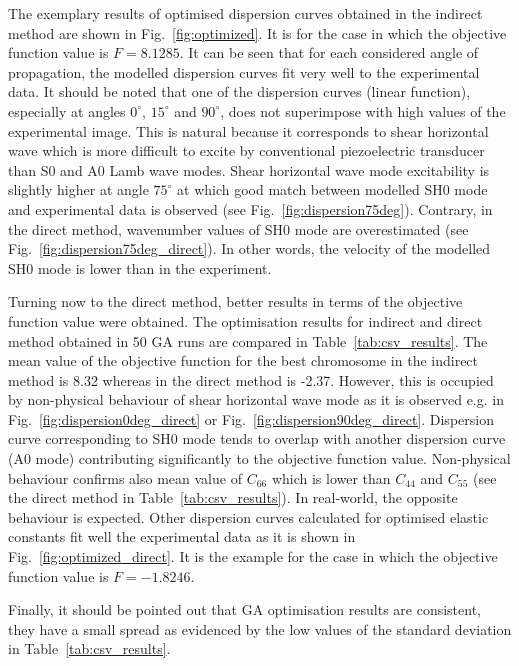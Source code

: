 \documentclass[preprint,12pt]{elsarticle}
\begin{document}
The exemplary results of optimised dispersion curves obtained in the indirect method 
are shown in Fig.~\ref{fig:optimized}. It is for the case in which the objective function 
value is \(F=8.1285\). It can be seen that for each considered angle of propagation, the 
modelled dispersion curves fit very well to the experimental data. It should be noted that 
one of the dispersion curves (linear function), especially at angles \(0^{\circ}\), 
\(15^{\circ}\) and \(90^{\circ}\), does not superimpose with high values of the 
experimental 
image. This is natural because it corresponds to shear horizontal wave which is more 
difficult to excite by conventional piezoelectric transducer than S0 and A0 Lamb wave 
modes. Shear horizontal wave mode excitability is slightly higher at angle \(75^{\circ}\) 
at 
which good match between modelled SH0 mode and experimental data is observed 
(see Fig.~\ref{fig:dispersion75deg}). Contrary, in the direct method, wavenumber values 
of SH0 mode are overestimated (see Fig.~\ref{fig:dispersion75deg_direct}). In other 
words, the velocity of the modelled SH0 mode is lower than in the experiment.

Turning now to the direct method, better results in terms of the objective function value 
were obtained. The optimisation results for indirect and direct method obtained in 50 
GA runs are compared in Table~\ref{tab:csv_results}. The mean value of the objective 
function for the best chromosome in the indirect method is 8.32 whereas in the direct 
method is -2.37. However, this is occupied by non-physical behaviour of shear 
horizontal wave mode as it is observed e.g. in Fig.~\ref{fig:dispersion0deg_direct} or 
Fig.~\ref{fig:dispersion90deg_direct}. Dispersion curve corresponding to SH0 mode 
tends to overlap with another dispersion curve (A0 mode) contributing significantly to 
the objective function value. Non-physical behaviour confirms also mean value of 
\(C_{66}\) which is lower than \(C_{44}\) and \(C_{55}\) (see the direct method in 
Table~\ref{tab:csv_results}). In real-world, the opposite behaviour is expected. Other 
dispersion curves calculated for optimised elastic constants fit well the experimental 
data as it is shown in Fig.~\ref{fig:optimized_direct}. It is the example for the case in 
which the objective function value is \(F=-1.8246\).

Finally, it should be pointed out that GA optimisation results are consistent, they have a 
small spread as 
evidenced by the low values of the standard deviation in Table~\ref{tab:csv_results}. 
\end{document}

